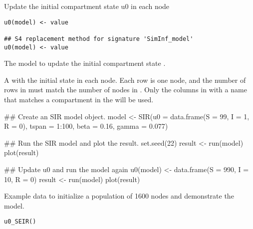 \documentclass[letterpaper]{book}
\begin{document}
%
\begin{Description}
Update the initial compartment state u0 in each node
\end{Description}
%
\begin{Usage}
\begin{verbatim}
u0(model) <- value

## S4 replacement method for signature 'SimInf_model'
u0(model) <- value
\end{verbatim}
\end{Usage}
%
\begin{Arguments}
\begin{ldescription}
\item[\code{model}] The model to update the initial compartment state
.

\item[\code{value}] A  with the initial state in each
node. Each row is one node, and the number of rows in
 must match the number of nodes in . Only
the columns in  with a name that matches a
compartment in the  will be used.
\end{ldescription}
\end{Arguments}
%
\begin{Examples}
\begin{ExampleCode}
## Create an SIR model object.
model <- SIR(u0 = data.frame(S = 99, I = 1, R = 0),
             tspan = 1:100,
             beta = 0.16,
             gamma = 0.077)

## Run the SIR model and plot the result.
set.seed(22)
result <- run(model)
plot(result)

## Update u0 and run the model again
u0(model) <- data.frame(S = 990, I = 10, R = 0)
result <- run(model)
plot(result)
\end{ExampleCode}
\end{Examples}
%
\begin{Description}
Example data to initialize a population of 1600 nodes and
demonstrate the  model.
\end{Description}
%
\begin{Usage}
\begin{verbatim}
u0_SEIR()
\end{verbatim}
\end{Usage}
\end{document}
